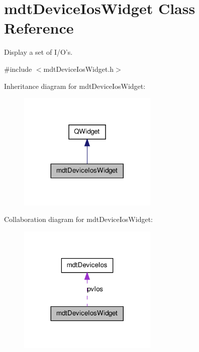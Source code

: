 \hypertarget{classmdt_device_ios_widget}{\section{mdt\-Device\-Ios\-Widget Class Reference}
\label{classmdt_device_ios_widget}
}


Display a set of I/\-O's.  




{\ttfamily \#include $<$mdt\-Device\-Ios\-Widget.\-h$>$}



Inheritance diagram for mdt\-Device\-Ios\-Widget\-:
\nopagebreak
\begin{figure}[H]
\begin{center}
\leavevmode
\includegraphics[width=188pt]{classmdt_device_ios_widget__inherit__graph}
\end{center}
\end{figure}


Collaboration diagram for mdt\-Device\-Ios\-Widget\-:
\nopagebreak
\begin{figure}[H]
\begin{center}
\leavevmode
\includegraphics[width=188pt]{classmdt_device_ios_widget__coll__graph}
\end{center}
\end{figure}
